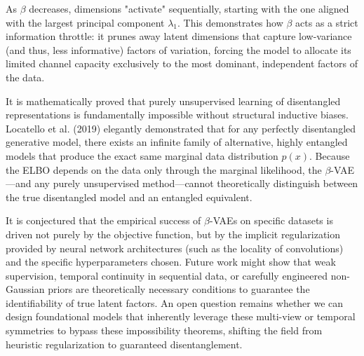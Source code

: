 As $\beta$ decreases, dimensions "activate" sequentially, starting with the one aligned with the largest principal component $\lambda_1$. This demonstrates how $\beta$ acts as a strict information throttle: it prunes away latent dimensions that capture low-variance (and thus, less informative) factors of variation, forcing the model to allocate its limited channel capacity exclusively to the most dominant, independent factors of the data.

\begin{horizon}
It is mathematically proved that purely unsupervised learning of disentangled representations is fundamentally impossible without structural inductive biases. Locatello et al. (2019) elegantly demonstrated that for any perfectly disentangled generative model, there exists an infinite family of alternative, highly entangled models that produce the exact same marginal data distribution $p(x)$. Because the ELBO depends on the data only through the marginal likelihood, the $\beta$-VAE—and any purely unsupervised method—cannot theoretically distinguish between the true disentangled model and an entangled equivalent.

It is conjectured that the empirical success of $\beta$-VAEs on specific datasets is driven not purely by the objective function, but by the implicit regularization provided by neural network architectures (such as the locality of convolutions) and the specific hyperparameters chosen. Future work might show that weak supervision, temporal continuity in sequential data, or carefully engineered non-Gaussian priors are theoretically necessary conditions to guarantee the identifiability of true latent factors. An open question remains whether we can design foundational models that inherently leverage these multi-view or temporal symmetries to bypass these impossibility theorems, shifting the field from heuristic regularization to guaranteed disentanglement.
\end{horizon}

